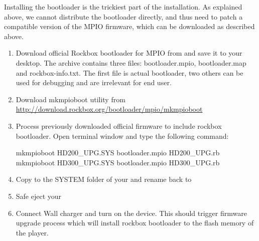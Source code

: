 
  Installing the bootloader is the trickiest part of the installation.
  As explained above, we cannot distribute the bootloader directly, and
  thus need to patch a compatible version of the MPIO firmware, which
  can be downloaded as described above.


\begin{enumerate}
   \item Download official Rockbox bootloader for MPIO \playertype{} from
   and save it to your desktop. The archive contains three files: bootloader.mpio, 
   bootloader.map and rockbox-info.txt. The first file is actual bootloader, two
   others can be used for debugging and are irrelevant for end user.
   \item Download mkmpioboot utility from \url{http://download.rockbox.org/bootloader/mpio/mkmpioboot}
   \item Process previously downloaded official firmware to include rockbox bootloader.
   Open terminal window and type the following command:
     \begin{code}[firstline=\opt{mpiohd200}{1}\opt{mpiohd300}{2},
                  lastline=\opt{mpiohd200}{1}\opt{mpiohd300}{2}]
       mkmpioboot HD200_UPG.SYS bootloader.mpio HD200_UPG.rb
       mkmpioboot HD300_UPG.SYS bootloader.mpio HD300_UPG.rb
     \end{code}
   \item Copy %
   to the SYSTEM folder of your \dap{} and rename back to
   \item Safe eject your \dap{}
   \item Connect Wall charger and turn on the device. This should trigger firmware
   upgrade process which will install rockbox bootloader to the flash memory of the
   player.
\end{enumerate}
